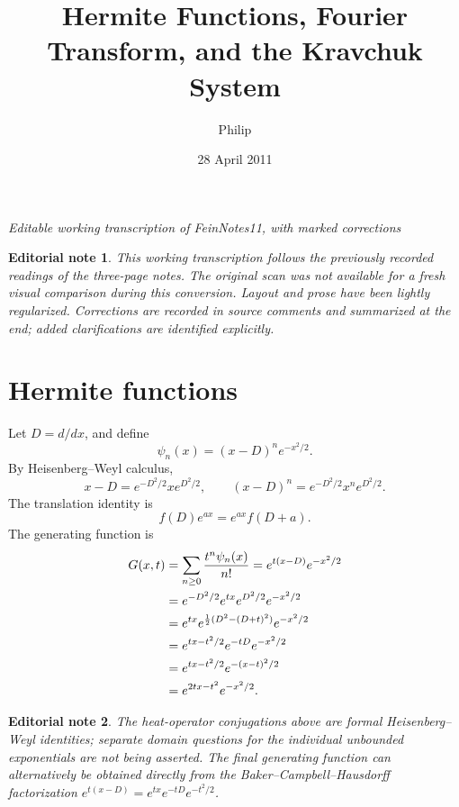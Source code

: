 \documentclass[11pt]{amsart}
\title{Hermite Functions, Fourier Transform, and the Kravchuk System}
\author{Philip}
\date{28 April 2011}
\newtheorem*{editorial}{Editorial note}
\begin{document}
\maketitle
\begin{center}
\textit{Editable working transcription of FeinNotes11, with marked corrections}
\end{center}


\begin{editorial}
This working transcription follows the previously recorded readings of the
three-page notes. The original scan was not available for a fresh visual
comparison during this conversion. Layout and prose have been lightly
regularized. Corrections are recorded in source comments and summarized
at the end; added clarifications are identified explicitly.
\end{editorial}

\section{Hermite functions}
Let $D=d/dx$, and define
\begin{equation}\label{eq:psi}
\psi_n(x)=(x-D)^n e^{-x^2/2}.
\end{equation}
By Heisenberg--Weyl calculus,
\[
x-D=e^{-D^2/2}xe^{D^2/2},\qquad
(x-D)^n=e^{-D^2/2}x^ne^{D^2/2}.
\]
The translation identity is
\[
f(D)e^{ax}=e^{ax}f(D+a).
\]
The generating function is
\begin{align}
G(x,t)&=\sum_{n\ge0}\frac{t^n\psi_n(x)}{n!}
=e^{t(x-D)}e^{-x^2/2}\notag\\
&=e^{-D^2/2}e^{tx}e^{D^2/2}e^{-x^2/2}\notag\\
&=e^{tx}e^{\frac12(D^2-(D+t)^2)}e^{-x^2/2}\notag\\
&=e^{tx-t^2/2}e^{-tD}e^{-x^2/2}\notag\\
&=e^{tx-t^2/2}e^{-(x-t)^2/2}\notag\\
&=e^{2tx-t^2}e^{-x^2/2}.\label{eq:G}
\end{align}
\begin{editorial}
The heat-operator conjugations above are formal Heisenberg--Weyl
identities; separate domain questions for the individual unbounded
exponentials are not being asserted. The final generating function
can alternatively be obtained directly from the Baker--Campbell--Hausdorff
factorization $e^{t(x-D)}=e^{tx}e^{-tD}e^{-t^2/2}$.
\end{editorial}
\end{document}
